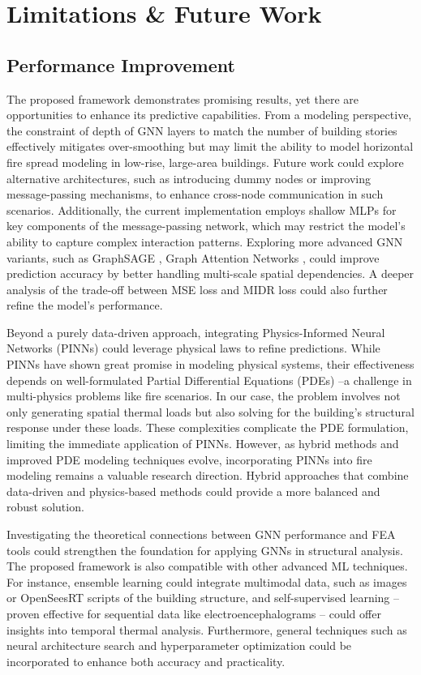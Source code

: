 {\blockRevise
\section{Limitations \& Future Work}
\label{sec:discussions}
\subsection{Performance Improvement} 
The proposed framework demonstrates promising results, yet there are opportunities to enhance its predictive capabilities. From a modeling perspective, the constraint of depth of GNN layers to match the number of building stories effectively mitigates over-smoothing but may limit the ability to model horizontal fire spread modeling in low-rise, large-area buildings. Future work could explore alternative architectures, such as introducing dummy nodes or improving message-passing mechanisms, to enhance cross-node communication in such scenarios. Additionally, the current implementation employs shallow MLPs for key components of the message-passing network, which may restrict the model's ability to capture complex interaction patterns. Exploring more advanced GNN variants, such as GraphSAGE \cite{hamilton2017inductive}, Graph Attention Networks \cite{velickovic2018graph}, could improve prediction accuracy by better handling multi-scale spatial dependencies. A deeper analysis of the trade-off between MSE loss and MIDR loss could also further refine the model's performance.

Beyond a purely data-driven approach, integrating Physics-Informed Neural Networks (PINNs) could leverage physical laws to refine predictions. While PINNs have shown great promise in modeling physical systems, their effectiveness depends on well-formulated Partial Differential Equations (PDEs) --a challenge in multi-physics problems like fire scenarios. In our case, the problem involves not only generating spatial thermal loads but also solving for the building's structural response under these loads. These complexities complicate the PDE formulation, limiting the immediate application of PINNs. However, as hybrid methods and improved PDE modeling techniques evolve, incorporating PINNs into fire modeling remains a valuable research direction. Hybrid approaches that combine data-driven and physics-based methods could provide a more balanced and robust solution. 

Investigating the theoretical connections between GNN performance and FEA tools could strengthen the foundation for applying GNNs in structural analysis. The proposed framework is also compatible with other advanced ML techniques. For instance, ensemble learning \cite{alam_dynamic_2020} could integrate multimodal data, such as images or OpenSeesRT scripts of the building structure, and self-supervised learning --proven effective for sequential data like electroencephalograms \cite{rafiei_selfsupervised_2024a, rafiei_selfsupervised_2024}-- could offer insights into temporal thermal analysis. Furthermore, general techniques such as neural architecture search and hyperparameter optimization could  be incorporated to enhance both accuracy and practicality.

}
